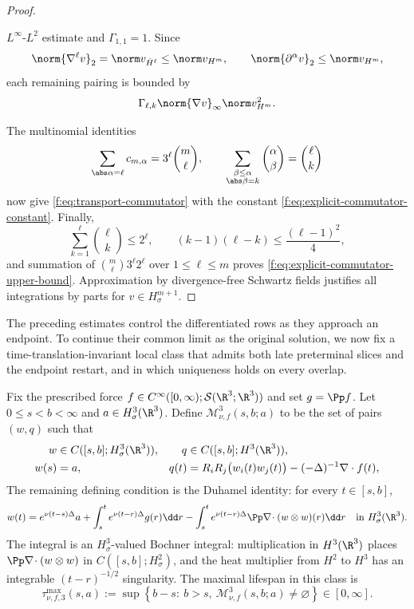 \begin{proof}
\begin{samepage}
\(L^\infty\)-\(L^2\) estimate and \(\Gamma_{1,1}=1\).  Since
\[
 \norm{\nabla^\ell v}_2=\norm v_{\dot H^\ell}\le\norm v_{H^m},
 \qquad
 \norm{\partial^\alpha v}_2\le\norm v_{H^m},
\]
each remaining pairing is bounded by
\[
 \Gamma_{\ell,k}\norm{\nabla v}_\infty\norm v_{H^m}^2.
\]
\par
\end{samepage}
The multinomial identities
\[
 \sum_{\abs\alpha=\ell}c_{m,\alpha}
 =3^\ell\binom m\ell,
 \qquad
 \sum_{\substack{\beta\le\alpha\\\abs\beta=k}}
 \binom\alpha\beta=\binom\ell k
\]
now give \eqref{f:eq:transport-commutator} with the constant
\eqref{f:eq:explicit-commutator-constant}.  Finally,
\[
 \sum_{k=1}^{\ell}\binom\ell k\le2^\ell,
 \qquad
 (k-1)(\ell-k)\le\frac{(\ell-1)^2}{4},
\]
and summation of
\(
 \binom m\ell3^\ell2^\ell
\)
over \(1\le\ell\le m\) proves
\eqref{f:eq:explicit-commutator-upper-bound}.  Approximation by divergence-free
Schwartz fields justifies all integrations by parts for
\(v\in H^{m+1}_\sigma\).
\end{proof}

The preceding estimates control the differentiated rows as they approach an
endpoint.  To continue their common limit as the original solution, we now fix a
time-translation-invariant local class that admits both late preterminal
slices and the endpoint restart, and in which uniqueness holds on every
overlap.

\begin{definition}
\label{f:def:shifted-normalized-H3-mild-class}
Fix the prescribed force
\(f\in C^\infty([0,\infty);\mathcal S(\R^3;\R^3))\) and set
\(g=\Pp f\).  Let \(0\le s<b<\infty\) and
\(a\in H^3_\sigma(\R^3)\).  Define
\(\mathscr M_{\nu,f}^3(s,b;a)\) to be the set of pairs \((w,q)\) such that
\begin{align}
 w&\in C([s,b];H^3_\sigma(\R^3)),
 &q&\in C([s,b];H^3(\R^3)),
 \label{f:eq:shifted-mild-class-spaces}\\
 w(s)&=a,
 &q(t)&=R_iR_j\bigl(w_i(t)w_j(t)\bigr)
 -(-\Delta)^{-1}\nabla\cdot f(t),
 \label{f:eq:shifted-mild-class-datum-pressure}
\end{align}
The remaining defining condition is the Duhamel identity: for every
\(t\in[s,b]\),
\begin{equation}
 w(t)=e^{\nu(t-s)\Delta}a
 +\int_s^t e^{\nu(t-r)\Delta}g(r)\dd r
 -\int_s^t e^{\nu(t-r)\Delta}
 \Pp\nabla\!\cdot(w\otimes w)(r)\dd r
 \quad\text{in }H^3_\sigma(\R^3).
 \label{f:eq:shifted-mild-class-duhamel}
\end{equation}
The integral is an \(H^3_\sigma\)-valued Bochner integral: multiplication in
\(H^3(\R^3)\) places
\(\Pp\nabla\!\cdot(w\otimes w)\) in \(C([s,b];H^2_\sigma)\), and the heat
multiplier from \(H^2\) to \(H^3\) has an integrable
\((t-r)^{-1/2}\) singularity.
The maximal lifespan in this class is
\begin{equation}
 \tau_{\nu,f,3}^{\max}(s,a)
 :=\sup\left\{b-s:\ b>s,\
 \mathscr M_{\nu,f}^3(s,b;a)\ne\varnothing\right\}\in[0,\infty].
 \label{f:eq:shifted-mild-maximal-lifespan}
\end{equation}
\end{definition}

